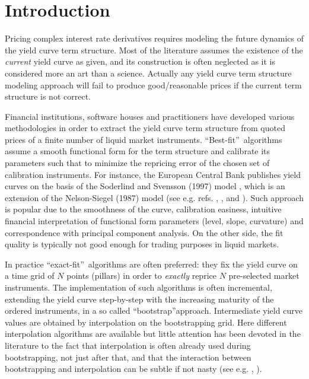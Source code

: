 \documentclass[11pt,reqno]{amsart}
\begin{document}
\maketitle

\section{\label{SecIntro}Introduction}
Pricing complex interest rate derivatives requires modeling the future dynamics of the yield curve term structure. Most of the literature assumes the existence of the \emph{current} yield curve as given, and its construction is often neglected as it is considered more an art than a science. Actually any yield curve term structure modeling approach will fail to produce good/reasonable prices if the current term structure is not correct.

Financial institutions, software houses and practitioners have developed various methodologies in order to extract the yield curve term structure from quoted prices of a finite number of liquid market instruments. \textquotedblleft Best-fit\textquotedblright\ algorithms assume a smooth functional form for the term structure and calibrate its parameters such that to minimize the repricing error of the chosen set of calibration instruments. For instance, the European Central Bank publishes yield curves on the basis of the Soderlind and Svensson (1997) model \cite{SodSwe97}, which is an extension of the Nelson-Siegel (1987) model (see e.g. refs. \cite{NelSie97}, \cite{Diament}, \cite{ChrDie07} and \cite{Cor08}). Such approach is popular due to the smoothness of the curve, calibration easiness, intuitive financial interpretation of functional form parameters (level, slope, curvature) and correspondence with principal component analysis. On the other side, the fit quality is typically not good enough for trading purposes in liquid markets.
\par
In practice \textquotedblleft exact-fit\textquotedblright\ algorithms are often preferred: they fix the yield curve on a time grid of $N$ points (pillars) in order to \emph{exactly} reprice $N$ pre-selected market instruments. The implementation of such algorithms is often incremental, extending the yield curve step-by-step with the increasing maturity of the ordered instruments, in a so called \textquotedblleft bootstrap\textquotedblright approach. Intermediate yield curve values are obtained by interpolation on the bootstrapping grid. Here different interpolation algorithms are available but little attention has been devoted in the literature to the fact that interpolation is often already used during bootstrapping, not just after that, and that the interaction between bootstrapping and interpolation can be subtle if not nasty (see e.g. \cite{HagWes06}, \cite{HagWes08}).
\end{document}
